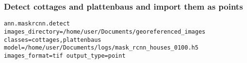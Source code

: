 \subsubsection*{Detect cottages and plattenbaus and import them as points}
\begin{lstlisting}[breaklines=true]
ann.maskrcnn.detect images_directory=/home/user/Documents/georeferenced_images classes=cottages,plattenbaus model=/home/user/Documents/logs/mask_rcnn_houses_0100.h5 images_format=tif output_type=point
\end{lstlisting}
